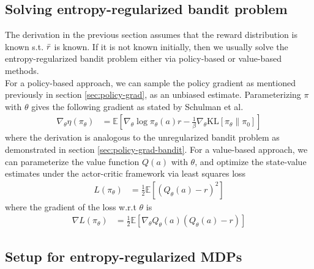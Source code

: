 \documentclass[12pt]{report}
\begin{document}

\subsection{Solving entropy-regularized bandit problem}

The derivation in the previous section assumes that the reward distribution is known s.t. $\Bar{r}$ is known. If it is not known initially, then we usually solve the entropy-regularized bandit problem either via policy-based or value-based methods.\\

For a policy-based approach, we can sample the policy gradient as mentioned previously in section \ref{sec:policy-grad}, as an unbiased estimate. Parameterizing $\pi$ with $\theta$ gives the following gradient as stated by Schulman et al. \cite{schulman2017equivalence}
\begin{align}
    \nabla_\theta \eta(\pi_\theta)&=\mathbb{E}\left[\nabla_\theta \log \pi_\theta(a)r-\frac{1}{\beta}\nabla_\theta\text{KL}[\pi_\theta\|\pi_0]\right]
\end{align}
where the derivation is analogous to the unregularized bandit problem as demonstrated in section \ref{sec:policy-grad-bandit}. For a value-based approach, we can parameterize the value function $Q(a)$ with $\theta$, and optimize the state-value estimates under the actor-critic framework via least squares loss
\begin{align}
    L(\pi_\theta)&=\frac{1}{2}\mathbb{E}\left[(Q_\theta(a)-r)^2\right]
\end{align}
where the gradient of the loss w.r.t $\theta$ is
\begin{align}
    \nabla L(\pi_\theta)&=\frac{1}{2}\mathbb{E}\left[\nabla_\theta Q_\theta(a)(Q_\theta(a)-r)\right]
\end{align}

\subsection{Setup for entropy-regularized MDPs} \label{sec:entropy-mdp}
\end{document}
